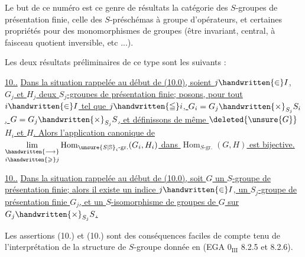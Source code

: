 Le but de ce numéro est  ce genre de résultats  la catégorie des $S$-groupes de présentation finie,  celle des $S$-préschémas à groupe d'opérateurs, et  certaines propriétés pour des monomorphismes de groupes (être invariant, central, à faisceau quotient inversible, etc ...).

Les deux résultats préliminaires de ce type sont les suivants :

\uline{10..}  \uline{Dans la situation rappelée au début de (10.0), soient  $j\handwritten{\in}I$, $G_j$ et $H_j$ deux $S_j$-groupes de présentation finie; posons, pour tout $i\handwritten{\in}I$ tel que $j\handwritten{\leqq}i$, $G_i=G_j\handwritten{\times}_{S_j}S_i$, $G=G_j\handwritten{\times}_{S_j}S$, et définissons de même $\deleted{\unsure{G}}$ $H_i$ et $H$. Alors l'application canonique de $\underset{i\handwritten{\geqslant}j}{\underset{\handwritten{\longrightarrow}}{\lim}}\operatorname{Hom}_{\unsure{S|\mathbb{S}}_i\text{-gr.}}(G_i,H_i)$ dans $\operatorname{Hom}_{S\text{-gr.}}(G,H)$ est bijective.}

\uline{10..}  \uline{Dans la situation rappelée au début de (10.0), soit $G$ un $S$-groupe de présentation finie; alors il existe un indice $j\handwritten{\in}I$,  un $S_j$-groupe de présentation  finie $G_j$, et un  $S$-isomorphisme de groupes de $G$ sur $G_j\handwritten{\times}_{S_j}S$.}

Les assertions (10.) et (10.) sont des conséquences faciles de  compte tenu de l'interprétation de la structure de $S$-groupe donnée en (EGA $0_{\mathrm{III}}$ 8.2.5 et 8.2.6).




